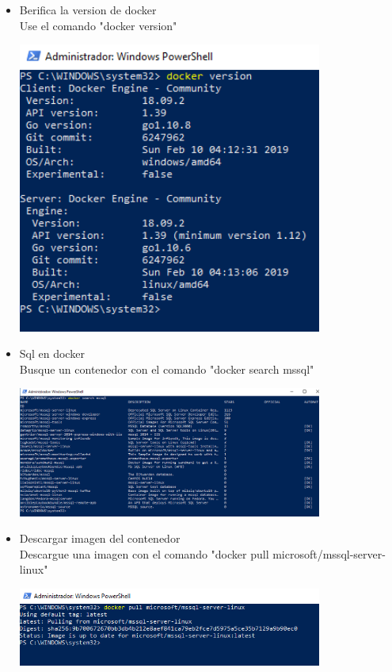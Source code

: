 \begin{itemize}
	\item Berifica la version de docker
	\\Use el comando "docker version"

	\begin{center}
	\includegraphics[width=10cm]{./Imagenes/4} 
	\end{center}

\end{itemize} 

\begin{itemize}
	\item Sql en docker
	\\Busque un contenedor con el comando "docker search mssql"

	\begin{center}
	\includegraphics[width=10cm]{./Imagenes/5} 
	\end{center}

\end{itemize} 

\begin{itemize}
	\item Descargar imagen del contenedor
	\\Descargue una imagen con el comando "docker pull microsoft/mssql-server-linux"

	\begin{center}
	\includegraphics[width=10cm]{./Imagenes/6} 
	\end{center}

\end{itemize}


